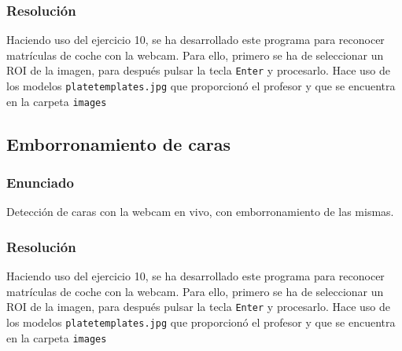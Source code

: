 \documentclass[a4paper,10pt,titlepage,oneside,openright]{book}
\begin{document}
\subsubsection*{Resolución}
Haciendo uso del ejercicio 10, se ha desarrollado este programa para reconocer matrículas de coche con la webcam. Para ello, primero se ha de seleccionar un ROI de la imagen, para después pulsar la tecla \texttt{Enter} y procesarlo. Hace uso de los modelos \texttt{platetemplates.jpg} que proporcionó el profesor y que se encuentra en la carpeta \texttt{images}



\medskip
\subsection{Emborronamiento de caras}

\subsubsection*{Enunciado}
Detección de caras con la webcam en vivo, con emborronamiento de las mismas.

\subsubsection*{Resolución}
Haciendo uso del ejercicio 10, se ha desarrollado este programa para reconocer matrículas de coche con la webcam. Para ello, primero se ha de seleccionar un ROI de la imagen, para después pulsar la tecla \texttt{Enter} y procesarlo. Hace uso de los modelos \texttt{platetemplates.jpg} que proporcionó el profesor y que se encuentra en la carpeta \texttt{images}
\end{document}
